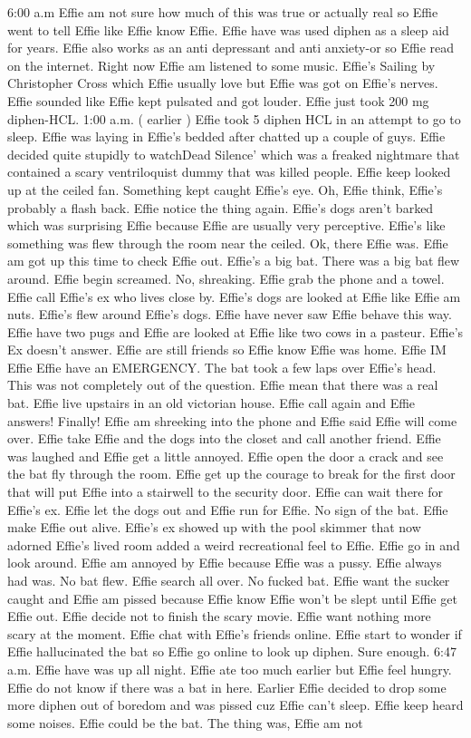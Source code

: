 \documentclass[12pt]{book}
\begin{document}
6:00 a.m Effie am not sure how much of this was true or actually real so Effie went to tell Effie like Effie know Effie. Effie have was used diphen as a sleep aid for years. Effie also works as an anti depressant and anti anxiety-or so Effie read on the internet. Right now Effie am listened to some music. Effie's Sailing by Christopher Cross which Effie usually love but Effie was got on Effie's nerves. Effie sounded like Effie kept pulsated and got louder. Effie just took 200 mg diphen-HCL. 1:00 a.m. ( earlier ) Effie took 5 diphen HCL in an attempt to go to sleep. Effie was laying in Effie's bedded after chatted up a couple of guys. Effie decided quite stupidly to watchDead Silence' which was a freaked nightmare that contained a scary ventriloquist dummy that was killed people. Effie keep looked up at the ceiled fan. Something kept caught Effie's eye. Oh, Effie think, Effie's probably a flash back. Effie notice the thing again. Effie's dogs aren't barked which was surprising Effie because Effie are usually very perceptive. Effie's like something was flew through the room near the ceiled. Ok, there Effie was. Effie am got up this time to check Effie out. Effie's a big bat. There was a big bat flew around. Effie begin screamed. No, shreaking. Effie grab the phone and a towel. Effie call Effie's ex who lives close by. Effie's dogs are looked at Effie like Effie am nuts. Effie's flew around Effie's dogs. Effie have never saw Effie behave this way. Effie have two pugs and Effie are looked at Effie like two cows in a pasteur. Effie's Ex doesn't answer. Effie are still friends so Effie know Effie was home. Effie IM Effie Effie have an EMERGENCY. The bat took a few laps over Effie's head. This was not completely out of the question. Effie mean that there was a real bat. Effie live upstairs in an old victorian house. Effie call again and Effie answers! Finally! Effie am shreeking into the phone and Effie said Effie will come over. Effie take Effie and the dogs into the closet and call another friend. Effie was laughed and Effie get a little annoyed. Effie open the door a crack and see the bat fly through the room. Effie get up the courage to break for the first door that will put Effie into a stairwell to the security door. Effie can wait there for Effie's ex. Effie let the dogs out and Effie run for Effie. No sign of the bat. Effie make Effie out alive. Effie's ex showed up with the pool skimmer that now adorned Effie's lived room added a weird recreational feel to Effie. Effie go in and look around. Effie am annoyed by Effie because Effie was a pussy. Effie always had was. No bat flew. Effie search all over. No fucked bat. Effie want the sucker caught and Effie am pissed because Effie know Effie won't be slept until Effie get Effie out. Effie decide not to finish the scary movie. Effie want nothing more scary at the moment. Effie chat with Effie's friends online. Effie start to wonder if Effie hallucinated the bat so Effie go online to look up diphen. Sure enough. 6:47 a.m. Effie have was up all night. Effie ate too much earlier but Effie feel hungry. Effie do not know if there was a bat in here. Earlier Effie decided to drop some more diphen out of boredom and was pissed cuz Effie can't sleep. Effie keep heard some noises. Effie could be the bat. The thing was, Effie am not 
\end{document}
